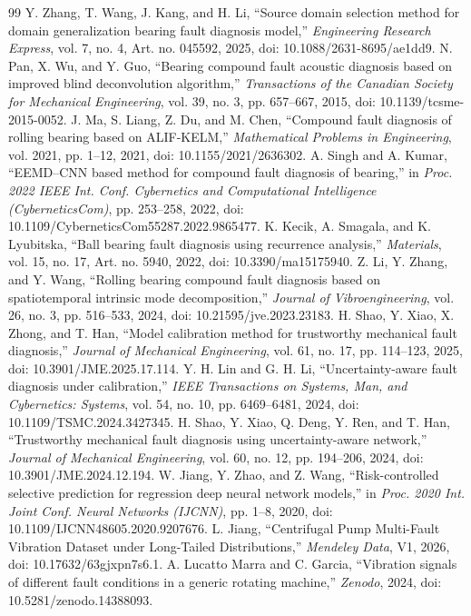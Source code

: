 \documentclass[machines,article,submit,oneauthor,pdftex]{Definitions/mdpi}
\begin{document}
\begin{thebibliography}{99}
 Y. Zhang, T. Wang, J. Kang, and H. Li, ``Source domain selection method for domain generalization bearing fault diagnosis model,'' \emph{Engineering Research Express}, vol. 7, no. 4, Art. no. 045592, 2025, doi: 10.1088/2631-8695/ae1dd9.
 N. Pan, X. Wu, and Y. Guo, ``Bearing compound fault acoustic diagnosis based on improved blind deconvolution algorithm,'' \emph{Transactions of the Canadian Society for Mechanical Engineering}, vol. 39, no. 3, pp. 657--667, 2015, doi: 10.1139/tcsme-2015-0052.
 J. Ma, S. Liang, Z. Du, and M. Chen, ``Compound fault diagnosis of rolling bearing based on ALIF-KELM,'' \emph{Mathematical Problems in Engineering}, vol. 2021, pp. 1--12, 2021, doi: 10.1155/2021/2636302.
 A. Singh and A. Kumar, ``EEMD--CNN based method for compound fault diagnosis of bearing,'' in \emph{Proc. 2022 IEEE Int. Conf. Cybernetics and Computational Intelligence (CyberneticsCom)}, pp. 253--258, 2022, doi: 10.1109/CyberneticsCom55287.2022.9865477.
 K. Kecik, A. Smagala, and K. Lyubitska, ``Ball bearing fault diagnosis using recurrence analysis,'' \emph{Materials}, vol. 15, no. 17, Art. no. 5940, 2022, doi: 10.3390/ma15175940.
 Z. Li, Y. Zhang, and Y. Wang, ``Rolling bearing compound fault diagnosis based on spatiotemporal intrinsic mode decomposition,'' \emph{Journal of Vibroengineering}, vol. 26, no. 3, pp. 516--533, 2024, doi: 10.21595/jve.2023.23183.
 H. Shao, Y. Xiao, X. Zhong, and T. Han, ``Model calibration method for trustworthy mechanical fault diagnosis,'' \emph{Journal of Mechanical Engineering}, vol. 61, no. 17, pp. 114--123, 2025, doi: 10.3901/JME.2025.17.114.
 Y. H. Lin and G. H. Li, ``Uncertainty-aware fault diagnosis under calibration,'' \emph{IEEE Transactions on Systems, Man, and Cybernetics: Systems}, vol. 54, no. 10, pp. 6469--6481, 2024, doi: 10.1109/TSMC.2024.3427345.
 H. Shao, Y. Xiao, Q. Deng, Y. Ren, and T. Han, ``Trustworthy mechanical fault diagnosis using uncertainty-aware network,'' \emph{Journal of Mechanical Engineering}, vol. 60, no. 12, pp. 194--206, 2024, doi: 10.3901/JME.2024.12.194.
 W. Jiang, Y. Zhao, and Z. Wang, ``Risk-controlled selective prediction for regression deep neural network models,'' in \emph{Proc. 2020 Int. Joint Conf. Neural Networks (IJCNN)}, pp. 1--8, 2020, doi: 10.1109/IJCNN48605.2020.9207676.
 L. Jiang, ``Centrifugal Pump Multi-Fault Vibration Dataset under Long-Tailed Distributions,'' \emph{Mendeley Data}, V1, 2026, doi: 10.17632/63gjxpn7s6.1.
 A. Lucatto Marra and C. Garcia, ``Vibration signals of different fault conditions in a generic rotating machine,'' \emph{Zenodo}, 2024, doi: 10.5281/zenodo.14388093.

\end{thebibliography}
\end{document}
